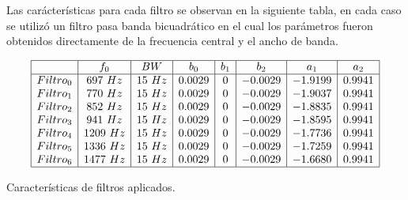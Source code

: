 \documentclass[letterpaper,onecolumn,10pt,journal,final]{IEEEtran}
\begin{document}
\begin{enumerate}[1)]
    Las carácterísticas para cada filtro se observan en la siguiente tabla, en cada caso se utilizó un filtro pasa banda bicuadrático en el cual los parámetros fueron obtenidos directamente de la frecuencia central y el ancho de banda.
    \begin{table}[H]
        \centering
        $$
        \begin{array}{|c|c|c|c|c|c|c|c|}
        \hline
        &f_0 & BW &b_0 &b_1 &b_2 &a_1 & a_2 \\
        \hline
        Filtro_0& 697~Hz & 15~Hz & 0.0029 & 0 & -0.0029 & -1.9199 & 0.9941 \\
        Filtro_1& 770~Hz & 15~Hz & 0.0029 & 0 & -0.0029 & -1.9037 & 0.9941 \\
        Filtro_2& 852~Hz & 15~Hz & 0.0029 & 0 & -0.0029 & -1.8835 & 0.9941 \\
        Filtro_3& 941~Hz & 15~Hz & 0.0029 & 0 & -0.0029 & -1.8595 & 0.9941 \\
        Filtro_4& 1209~Hz & 15~Hz & 0.0029 & 0 & -0.0029 & -1.7736 & 0.9941 \\
        Filtro_5& 1336~Hz & 15~Hz & 0.0029 & 0 & -0.0029 & -1.7259 & 0.9941 \\
        Filtro_6& 1477~Hz & 15~Hz & 0.0029 & 0 & -0.0029 & -1.6680 & 0.9941 \\
        \hline
        \end{array}
        $$
        \caption{Características de filtros aplicados. }
        \label{tab:my_label}
    \end{table}
\end{enumerate}
\end{document}
